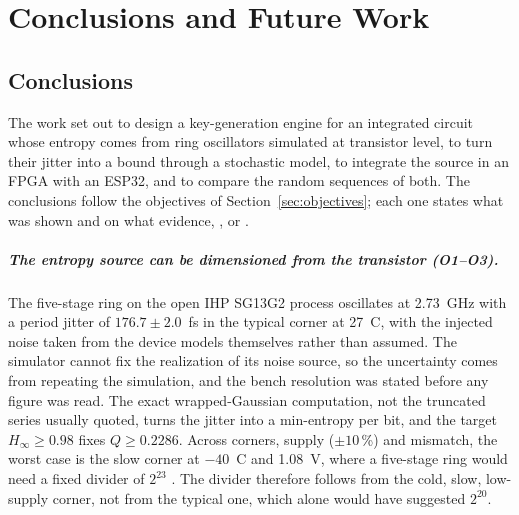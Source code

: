 \chapter{Conclusions and Future Work}
\label{ch:ch8_concl}

\section{Conclusions}

The work set out to design a key-generation engine for an integrated
circuit whose entropy comes from ring oscillators simulated at transistor
level, to turn their jitter into a bound through a stochastic model, to
integrate the source in an \ac{FPGA} with an ESP32, and to compare the
random sequences of both. The conclusions follow the objectives of
Section~\ref{sec:objectives}; each one states what was shown and on what
evidence, \meas{}, \simu{} or \est{}.

\paragraph{The entropy source can be dimensioned from the transistor
(O1--O3).} The five-stage ring on the open IHP SG13G2 process oscillates
at 2.73~GHz with a period jitter of $176.7 \pm 2.0$~fs \simu{} in the
typical corner at 27~\textdegree C, with the injected noise taken from
the device models themselves rather than assumed. The simulator cannot fix the
realization of its noise source, so the uncertainty comes from repeating
the simulation, and the bench resolution was stated before any figure was
read. The exact wrapped-Gaussian computation, not the truncated series
usually quoted, turns the jitter into a min-entropy per bit, and the
target $H_\infty \ge 0.98$ fixes $Q \ge 0.2286$. Across corners, supply
($\pm 10$\,\%) and mismatch, the worst case is the slow corner at
$-40$~\textdegree C and 1.08~V, where a five-stage ring would need a
fixed divider of $2^{23}$ \simu{}. The divider therefore follows from the
cold, slow, low-supply corner, not from the typical one, which alone
would have suggested $2^{20}$.

